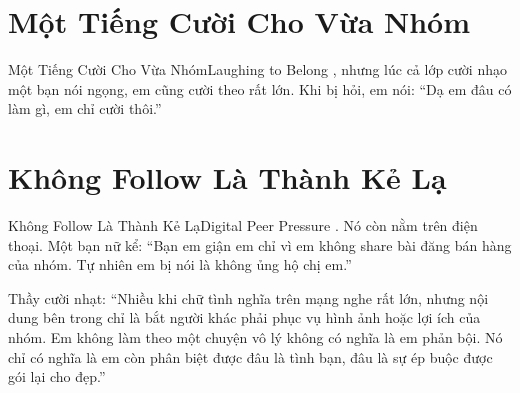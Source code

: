 \section{Một Tiếng Cười Cho Vừa Nhóm}
\begin{truyen}{Một Tiếng Cười Cho Vừa Nhóm}{Laughing to Belong}
, nhưng lúc cả lớp cười nhạo một bạn nói ngọng, em cũng cười theo rất lớn. Khi bị hỏi, em nói: ``Dạ em đâu có làm gì, em chỉ cười thôi.''

\end{truyen}

\section{Không Follow Là Thành Kẻ Lạ}
\begin{truyen}{Không Follow Là Thành Kẻ Lạ}{Digital Peer Pressure}
. Nó còn nằm trên điện thoại. Một bạn nữ kể: ``Bạn em giận em chỉ vì em không share bài đăng bán hàng của nhóm. Tự nhiên em bị nói là không ủng hộ chị em.''

Thầy cười nhạt: ``Nhiều khi chữ tình nghĩa trên mạng nghe rất lớn, nhưng nội dung bên trong chỉ là bắt người khác phải phục vụ hình ảnh hoặc lợi ích của nhóm. Em không làm theo một chuyện vô lý không có nghĩa là em phản bội. Nó chỉ có nghĩa là em còn phân biệt được đâu là tình bạn, đâu là sự ép buộc được gói lại cho đẹp.''
\end{truyen}

